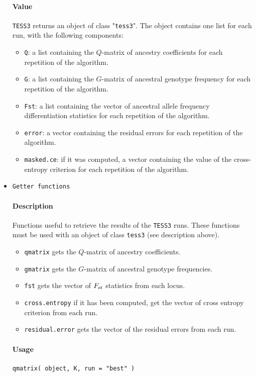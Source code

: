 \documentclass[10pt,a4paper]{article}
\begin{document}
\begin{itemize}
\paragraph{Value}
\verb|TESS3| returns an object of class "\verb|tess3|". The object contains one list for each run, with the following components: 

\begin{itemize}
\item \verb|Q|: a list containing the $Q$-matrix of ancestry coefficients for each repetition of the algorithm.
\item \verb|G|: a list containing the $G$-matrix of ancestral genotype frequency for each repetition of the algorithm.
\item \verb|Fst|: a list containing the vector of ancestral allele frequency differentiation statistics for each repetition of the algorithm.
\item \verb|error|: a vector containing the residual errors for each repetition of the algorithm.
\item \verb|masked.ce|: if it was computed, a vector containing the value of the cross-entropy criterion for each repetition of the algorithm.
\end{itemize}


\item \verb|Getter functions|

\paragraph{Description}
Functions useful to retrieve the results of the {\tt TESS3} runs. These functions must be used with an object of class \verb|tess3| (see description above).

\begin{itemize}
  \item[] \verb|qmatrix| gets the $Q$-matrix of ancestry coefficients.
  \item[] \verb|gmatrix| gets the $G$-matrix of ancestral genotype frequencies.
  \item[] \verb|fst| gets the vector of $F_{\rm st}$ statistics from each locus.
  \item[] \verb|cross.entropy| if it has been computed, get the vector of cross entropy criterion from each run.
  \item[] \verb|residual.error| gets the vector of the residual errors from each run.
\end{itemize}


\paragraph{Usage}
\begin{Verbatim}
qmatrix( object, K, run = "best" )
 

\end{Verbatim}
\end{itemize}
\end{document}
